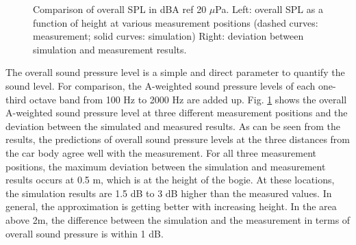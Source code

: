 \begin{figure}[H]
\begin{subfigure}[b]{0.49\textwidth}
	\end{subfigure}
	\caption{Comparison of overall SPL in dBA ref 20 $\mu$Pa. Left: overall SPL as a function of height at various measurement positions (dashed curves: measurement; solid curves: simulation) Right: deviation between simulation and measurement results.}
	\label{fig:overall_SPL}
\end{figure}

\noindent The overall sound pressure level is a simple and direct parameter to quantify the sound level. For comparison, the A-weighted sound pressure levels of each one-third octave band from 100 Hz to 2000 Hz are added up. Fig. \ref{fig:overall_SPL} shows the overall A-weighted sound pressure level at three different measurement positions and the deviation between the simulated and measured results. As can be seen from the results, the predictions of overall sound pressure levels at the three distances from the car body agree well with the measurement. For all three measurement positions, the maximum deviation between the simulation and measurement results occurs at 0.5 m, which is at the height of the bogie. At these locations, the simulation results are 1.5 dB to 3 dB higher than the measured values. In general, the approximation is getting better with increasing height. In the area above 2m, the difference between the simulation and the measurement in terms of overall sound pressure is within 1 dB.

